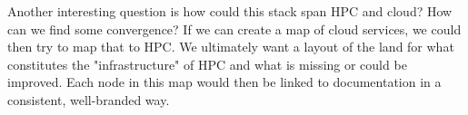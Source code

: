 Another interesting question is how could this stack span HPC and cloud? How can we find some convergence? If we can create a map of cloud services, we could then try to map that to HPC. We ultimately want a layout of the land for what constitutes the "infrastructure" of HPC and what is missing or could be improved. Each node in this map would then be linked to documentation in a consistent, well-branded way.
